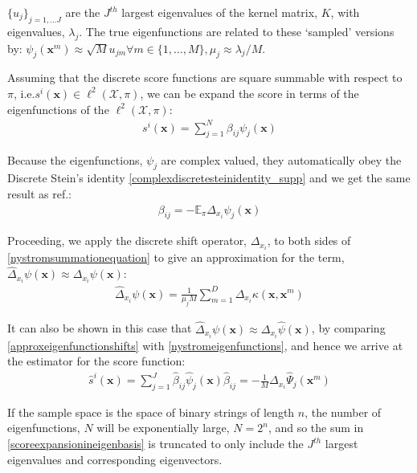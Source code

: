 $\{u_j\}_{j = 1, \dots J}$ are the $J^{th}$ largest eigenvalues of the kernel matrix, $K$, with eigenvalues, $\lambda_j$. The true eigenfunctions are related to these `sampled' versions by: $\psi_j(\mathbf{x}^m) \approx \sqrt{M} u_{jm} \forall m \in\{1, \dots, M\}, \mu_j \approx \lambda_j/M$.

Assuming that the discrete score functions are square summable with respect to $\pi$, i.e.\@ $s^i(\mathbf{x}) \in \ell^2(\mathcal{X}, \pi)$, we can be expand the score in terms of the eigenfunctions of the $\ell^2(\mathcal{X}, \pi)$:
\begin{align}
    s^i(\mathbf{x}) = \sum\limits^{N}_{j=1}\beta_{ij}\psi_j(\mathbf{x}) \label{scoreexpansionineigenbasis}
\end{align}

Because the eigenfunctions, $\psi_j$ are complex valued, they automatically obey the Discrete Stein's identity \eqref{complexdiscretesteinidentity_supp} and we get the same result as ref.:
\begin{align}
    \beta_{ij} = -\mathbb{E}_{\pi}\Delta_{x_i}\psi_j(\mathbf{x})
\end{align}


Proceeding, we apply the discrete shift operator, $\Delta_{x_i}$, to both sides of \eqref{nystromsummationequation} to give an approximation for the term, $\hat{\Delta}_{x_i}\psi(\mathbf{x})  \approx \Delta_{x_i}\psi(\mathbf{x})$:
\begin{align}
    \hat{\Delta}_{x_i}\psi(\mathbf{x}) = \frac{1}{\mu_j M}\sum\limits_{m=1}^D\Delta_{x_i}\kappa(\mathbf{x}, \mathbf{x}^m) \label{approxeigenfunctionshifts}
\end{align}


It can also be shown in this case that $\hat{\Delta}_{x_i}\psi(\mathbf{x}) \approx \Delta_{x_i}\hat{\psi}(\mathbf{x})$, by comparing \eqref{approxeigenfunctionshifts} with \eqref{nystromeigenfunctions}, and hence we arrive at the estimator for the score function:
\begin{align}
    \hat{s}^i(\mathbf{x}) = \sum\limits_{j=1}^J \hat{\beta}_{ij}\hat{\psi}_j(\mathbf{x}) \hat{\beta}_{ij} = -\frac{1}{M}\Delta_{x_i}\hat{\Psi}_j(\mathbf{x}^m) \label{spectralestimationfunctions}
\end{align}


If the sample space is the space of binary strings of length $n$, the number of eigenfunctions, $N$ will be exponentially large, $N = 2^n$, and so the sum in \eqref{scoreexpansionineigenbasis} is truncated to only include the $J^{th}$ largest eigenvalues and corresponding eigenvectors.